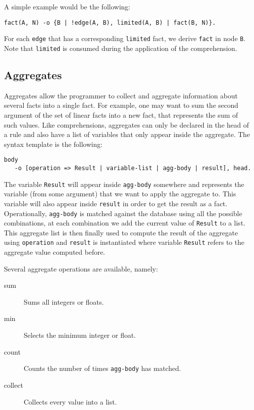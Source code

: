 \documentclass[11pt]{article}
\begin{document}
A simple example would be the following:

\begin{verbatim}
fact(A, N) -o {B | !edge(A, B), limited(A, B) | fact(B, N)}.
\end{verbatim}

For each \texttt{edge} that has a corresponding \texttt{limited} fact, we derive \texttt{fact} in node \texttt{B}. Note that \texttt{limited} is consumed during the application of the comprehension.

\subsection{Aggregates}

Aggregates allow the programmer to collect and aggregate information about several facts into a single fact. For example, one may want to sum the second argument of the set of linear facts into a new fact, that represents the sum of such values. Like comprehensions, aggregates can only be declared in the head of a rule and also have a list of variables that only appear inside the aggregate. The syntax template is the following:

\begin{verbatim}
body
   -o [operation => Result | variable-list | agg-body | result], head.
\end{verbatim}

The variable \texttt{Result} will appear inside \texttt{agg-body} somewhere and represents the variable (from some argument) that we want to apply the aggregate to. This variable
will also appear inside \texttt{result} in order to get the result as a fact. Operationally, \texttt{agg-body} is matched against the database using all the possible combinations, at each combination we add the current value of \texttt{Result} to a list. This aggregate list is then finally used to compute the result of the aggregate using \texttt{operation} and \texttt{result} is instantiated where variable \texttt{Result} refers to the aggregate value computed before.

Several aggregate operations are available, namely:

\begin{description}
\item[sum] Sums all integers or floats.
\item[min] Selects the minimum integer or float.
\item[count] Counts the number of times \texttt{agg-body} has matched.
\item[collect] Collects every value into a list.
\end{description}
\end{document}
